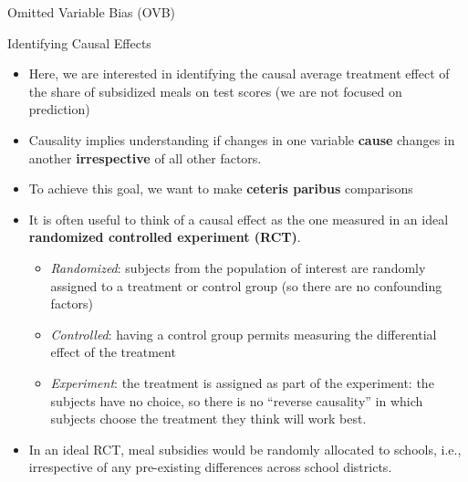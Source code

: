 \documentclass[notes,10pt, aspectratio=169]{beamer}
\begin{document}
\begin{frame}{Omitted Variable Bias (OVB)}
\begin{center}
{}

\end{center}

\end{frame}


\begin{frame}{Identifying Causal Effects}
\begin{itemize}
    \item Here, we are interested in identifying the causal average treatment effect of the share of subsidized meals on test scores (we are not focused on prediction)
    \item Causality implies understanding if changes in one variable \textbf{cause} changes in another \textbf{irrespective} of all other factors.
    \item To achieve this goal, we want to make \textbf{ceteris paribus} comparisons
    \item It is often useful to think of a causal effect as the one measured in an ideal \textbf{randomized controlled experiment (RCT)}.
    \begin{itemize}
        \item \textit{Randomized}: subjects from the population of interest are randomly assigned to a treatment or control group (so there are no confounding factors)
        \item \textit{Controlled}: having a control group permits measuring the differential effect of the treatment
        \item \textit{Experiment}: the treatment is assigned as part of the experiment: the subjects have no choice, so there is no “reverse causality” in which subjects choose the treatment they think will work best.
    \end{itemize}
    \item In an ideal RCT, meal subsidies would be randomly allocated to schools, i.e., irrespective of any pre-existing differences across school districts.
\end{itemize}
\end{frame}
\end{document}
